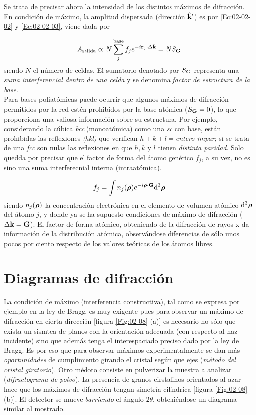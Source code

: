 Se trata de precisar ahora la intensidad de los distintos máximos de difracción. En condición de máximo, la amplitud dispersada (dirección $\hat{\mathbf{k}}'$) es por \ref{Ec:02-02-02} y \ref{Ec:02-02-03}, viene dada por 

\begin{equation}
    A_{\text{salida}} \propto N \sum_j^{\text{base}} f_j e^{-i\mathbf{r}_j \cdot \Delta \hat{\mathbf{k}}} = N S_{\mathbf{G}}
\end{equation}
siendo $N$ el número de celdas. El sumatorio denotado por $S_{\mathbf{G}}$ representa una \textit{suma interferencial dentro de una celda} y se denomina \textit{factor de estructura de la base}.  \\

Para bases poliatómicas puede ocurrir que algunos máximos de difracción permitidos por la red estén prohibidos por la base atómica ($S_{\mathbf{G}}=0$), lo que proporciona una valiosa información sobre su estructura. Por ejemplo, considerando la cúbica \textit{bcc} (monoatómica) como una \textit{sc} con base, están prohibidas las reflexiones \textit{(hkl)} que verifican $h+k+l=$\textit{entero impar}; si se trata de una {\it fcc}  son nulas las reflexiones en que $h,k$ y $l$ tienen \textit{distinta paridad}. Solo quedda por precisar que el factor de forma del átomo genérico $f_j$, a su vez, no es sino una suma interferecnial interna (intraatómica). \

\begin{equation}
    f_j = \int n_j (\boldsymbol{\rho}) e^{-i \boldsymbol{\rho} \cdot \mathbf{G}} \mathrm{d}^3 \boldsymbol{\rho}
\end{equation}
siendo $n_j (\boldsymbol{\rho})$ la concentración electrónica en el elemento de volumen atómico $\mathrm{d}^3 \boldsymbol{\rho}$ del átomo $j$, y donde ya se ha supuesto condiciones de máximo de difracción ($\Delta \mathbf{k}  = \mathbf{G}$). El factor de forma atómico, obteniendo de la difracción de rayos x da información de la distribución atómica, observándose diferencias de sólo unos pocos por ciento respecto de los valores teóricas de los átomos libres.

\section{Diagramas de difracción}

La condición de máximo (interferencia constructiva), tal como se expresa por ejemplo en la ley de Bragg, es muy exigente pues para observar un máximo de difracción en cierta dirección [figura \ref{Fig:02-08} (a)] es necesario no sólo que exista un sismtea de planos con la orientación adecuada (con respecto al haz incidente) sino que además tenga el interespaciado preciso dado por la ley de Bragg. Es por eso que para observar máximos experimentalmente se dan más \textit{oportunidades} de cumplimiento girando el cristal según que ejes (\textit{método del cristal giratorio}). Otro médoto consiste en pulverizar la muestra a analizar (\textit{difractograma de polvo}). La presencia de granos cirstalinos orientados al azar hace que los máximos de difracción tengan simetría cilíndrica [figura \ref{Fig:02-08} (b)]. El detector se mueve \textit{barriendo} el ángulo $2\theta$, obteniéndose un diagrama similar al mostrado. 

